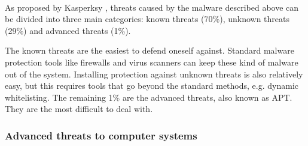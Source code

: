 ~~\\
As proposed by Kasperksy \cite{APTKaspersky}, threats caused by the malware described above can be divided into three main categories: known threats (70\%), unknown threats (29\%) and advanced threats (1\%). 

The known threats are the easiest to defend oneself against. Standard malware protection tools like firewalls and virus scanners can keep these kind of malware out of the system. Installing protection against unknown threats is also relatively easy, but this requires tools that go beyond the standard methods, e.g. dynamic whitelisting. The remaining 1\% are the advanced threats, also known as APT. They are the most difficult to deal with.


\subsubsection{Advanced threats to computer systems}

